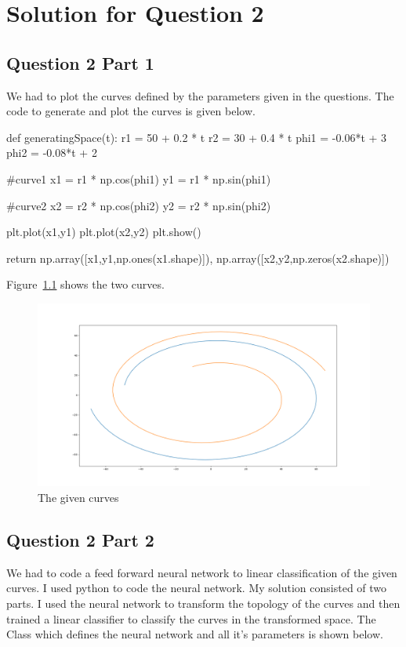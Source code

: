 \documentclass[12pt]{report}
\begin{document}
	
\chapter{Solution for Question 2}

\section{Question 2 Part 1}

We had to plot the curves defined by the parameters given in the questions. The code to generate and plot the curves is given below. 

\begin{python}
	def generatingSpace(t):
		r1 = 50 + 0.2 * t
		r2 = 30 + 0.4 * t
		phi1 = -0.06*t + 3
		phi2 = -0.08*t + 2
		
		#curve1
		x1 = r1 * np.cos(phi1)
		y1 = r1 * np.sin(phi1)
		
		#curve2
		x2 = r2 * np.cos(phi2)
		y2 = r2 * np.sin(phi2)
		
		plt.plot(x1,y1)
		plt.plot(x2,y2)
		plt.show()
		
		return np.array([x1,y1,np.ones(x1.shape)]), np.array([x2,y2,np.zeros(x2.shape)])
\end{python}

Figure~\ref{fig:8} shows the two curves.

\begin{figure}
	\centering
	\includegraphics[scale=0.3]{question3}
	\caption{The given curves}
	\label{fig:8}
\end{figure}

\section{Question 2 Part 2}
We had to code a feed forward neural network to linear classification of the given curves. I used python to code the neural network. My solution consisted of two parts. I used the neural network to transform the topology of the curves and then trained a linear classifier to classify the curves in the transformed space. The Class which defines the neural network and all it's parameters is shown below.
\end{document}
